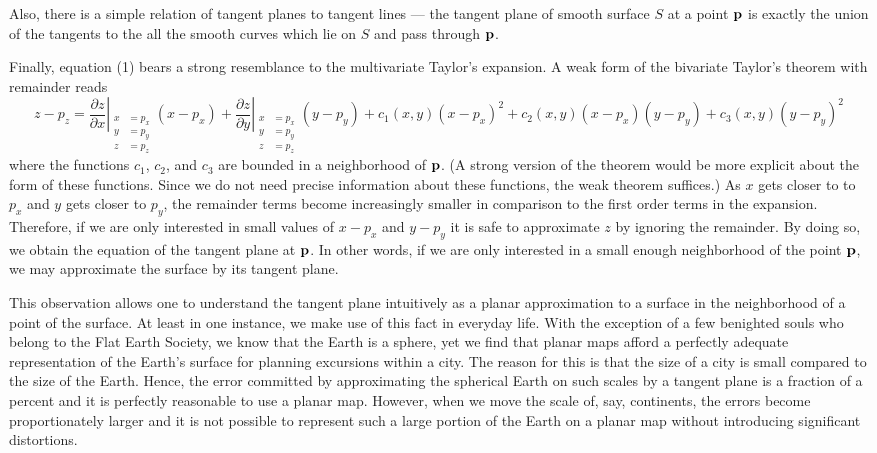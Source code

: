 \documentclass[12pt]{article}
\begin{document}
Also, there is a simple relation of tangent planes to tangent lines --- the tangent plane of smooth surface $S$ at a point ${\bf p}$ is exactly the union of the tangents to the all the smooth curves which lie on $S$ and pass through ${\bf p}$.

Finally, equation (1) bears a strong resemblance to the multivariate Taylor's expansion.  A weak form of the bivariate Taylor's theorem with remainder reads
 $$z - p_z = \left. \frac{\partial z}{\partial x} \right|_{\begin{matrix}x &= p_x \\ y &= p_y \\z &= p_z\end{matrix}} (x - p_x) + \left. \frac{\partial z}{\partial y} \right|_{\begin{matrix}x &= p_x \\ y &= p_y \\z &= p_z\end{matrix}} (y - p_y) + c_1 (x,y) (x - p_x)^2 + c_2 (x,y) (x - p_x) (y - p_y) + c_3 (x,y) (y - p_y)^2 $$
where the functions $c_1$, $c_2$, and $c_3$ are bounded in a neighborhood of ${\bf p}$.  (A strong version of the theorem would be more explicit about the form of these functions.  Since we do not need precise information about these functions, the weak theorem suffices.)  As $x$ gets closer to to $p_x$ and $y$ gets closer to $p_y$, the remainder terms become increasingly smaller in comparison to the first order terms in the expansion.  Therefore, if we are only interested in small values of $x - p_x$ and $y - p_y$ it is safe to approximate $z$ by ignoring the remainder.  By doing so, we obtain the equation of the tangent plane at ${\bf p}$.  In other words, if we are only interested in a small enough neighborhood of the point ${\bf p}$, we may approximate the surface by its tangent plane.

This observation allows one to understand the tangent plane intuitively as a planar approximation to a surface in the neighborhood of a point of the surface.  At least in one instance, we make use of this fact in everyday life.  With the exception of a few benighted souls who belong to the Flat Earth Society, we know that the Earth is a sphere, yet we find that planar maps afford a perfectly adequate representation of the Earth's surface for planning excursions within a city.  The reason for this is that the size of a city is small compared to the size of the Earth.  Hence, the error committed by approximating the spherical Earth on such scales by a tangent plane is a fraction of a percent and it is perfectly reasonable to use a planar map.  However, when we move the scale of, say, continents, the errors become proportionately larger and it is not possible to represent such a large portion of the Earth on a planar map without introducing significant distortions.
\end{document}
